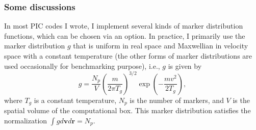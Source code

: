 \documentclass{article}
\begin{document}
\subsubsection{Some discussions}

In most PIC codes I wrote, I implement several kinds of marker distribution
functions, which can be chosen via an option. In practice, I primarily use the
marker distribution $g$ that is uniform in real space and Maxwellian in
velocity space with a constant temperature (the other forms of marker
distributions are used occasionally for benchmarking purpose), i.e., $g$ is
given by
\begin{equation}
  \label{18-12-15-1} g = \frac{N_p}{V} \left( \frac{m}{2 \pi T_g} \right)^{3 /
  2} \exp \left( - \frac{m v^2}{2 T_g} \right),
\end{equation}
where $T_g$ is a constant temperature, $N_p$ is the number of markers, and $V$
is the spatial volume of the computational box. This marker distribution
satisfies the normalization $\int g d\mathbf{v}d\mathbf{r}= N_p$.
\end{document}
